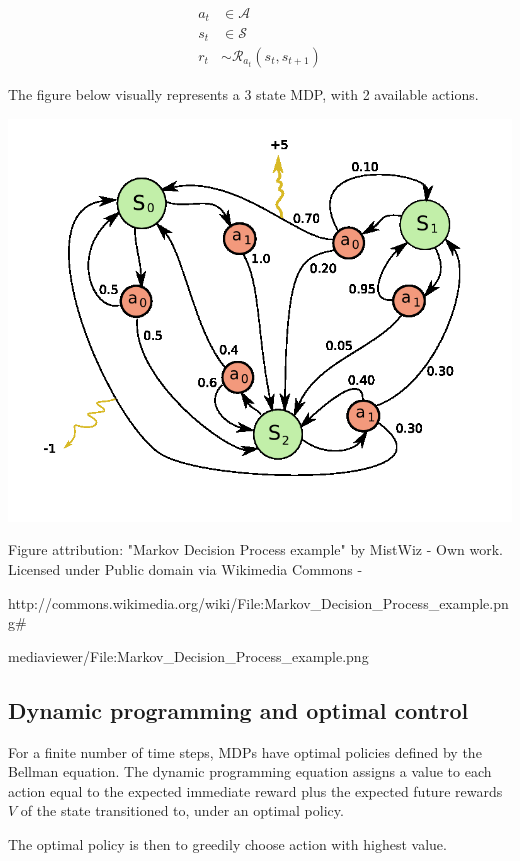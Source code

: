 \documentclass[11pt,a4,singlespacing,titlepagenumber=on]{scrreprt}
\numberwithin{equation}{chapter} %
\theoremstyle{remark}
\begin{document}
\begin{align}
a_t &\in \mathcal{A} \\
s_t &\in \mathcal{S} \\
r_t &\sim \mathcal{R}_{a_t}(s_t,s_{t+1})
\end{align}

The figure below visually represents a 3 state MDP, with 2 available actions.

\includegraphics[scale=0.5]{MDP_example.png}

Figure attribution: "Markov Decision Process example" by MistWiz - Own work. Licensed under Public domain via Wikimedia Commons - 

http://commons.wikimedia.org/wiki/File:Markov\_Decision\_Process\_example.png\#

mediaviewer/File:Markov\_Decision\_Process\_example.png

\subsection{ Dynamic programming and optimal control }

For a finite number of time steps, MDPs have optimal policies defined by the Bellman equation. The dynamic programming equation assigns a value to each action equal to the expected immediate reward plus the expected future rewards $V$ of the state transitioned to, under an optimal policy.

The optimal policy is then to greedily choose action with highest value.
\end{document}
